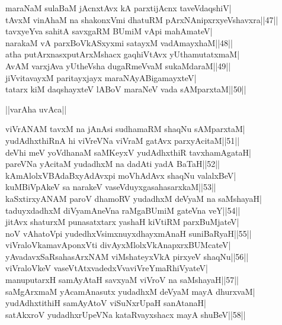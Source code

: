 \documentclass{article}
\begin{document}
maraNaM sulaBaM jAcnxtAvx kA parxtijAcnx taveVdaqshiV|\\
tAvxM vinAhaM na shakonxVmi dhatuRM pArxNAnipxrxyeVshavxra||47||\\
tavxyeYva sahitA savxgaRM BUmiM vApi mahAmateV|\\
narakaM vA parxBoVkASxyxmi satayxM vadAmayxhaM||48||\\
atha putArxnasxputArxMshacx gaqhiVtAvx yUthamutatxmaM|\\
AvAM varxjAva yUtheVsha dugaRmeVvaM sukaMdaraM||49||\\
jiVvitavayxM paritayxjayx maraNAyABigamayxteV|\\
tatarx kiM daqshayxteV lABoV maraNeV vada sAMparxtaM||50||

\begin{center}
||varAha uvAca||
\end{center}

viVrANAM tavxM na jAnAsi sudhamaRM shaqNu sAMparxtaM|\\
yudAdhxthiRnA hi viVreVNa viVraM gatAvx parxyAcitaM||51||\\
deVhi meV yoVdhanaM saMKeyxV yudAdhxthiR tavxhamAgataH|\\
pareVNa yAcitaM yudadhxM na dadAti yadA BaTaH||52||\\
kAmAlolxVBAdaBxyAdAvxpi moVhAdAvx shaqNu valalxBeV|\\
kuMBiVpAkeV sa narakeV vaseVduyxgasahasarxkaM||53||\\
kaSxtirxyANAM paroV dhamoRV yudadhxM deVyaM na saMshayaH|\\
taduyxdadhxM diVyamAneVna raMgaBUmiM gateVna veY||54||\\
jitAvx shaturxM punasatxtarx yashaH kiVtiRM parxBuMjateV|\\
noV vAhatoVpi yudedhxVsimxnuyxdhayxmAnaH suniBaRyaH||55||\\
viVraloVkamavAponxVti divAyxMlolxVkAnapxrxBUMcateV|\\
yAvadavxSaRsahasArxNAM viMshateyxVkA pirxyeV shaqNu||56||\\
viVraloVkeV vaseVtAtxvadedxVvaviVreYmaRhiVyateV|\\
manuputarxH samAyAtaH savxyaM viVroV na saMshayaH||57||\\
saMgArxmaM yAcamAnasutx yudadhxM deVyaM mayA dhurxvaM|\\
yudAdhxtithiH samAyAtoV viSuNxrUpaH sanAtanaH|\\
satAkxroV yudadhxrUpeVNa kataRvayxshacx mayA shuBeV||58||\\
\end{document}
